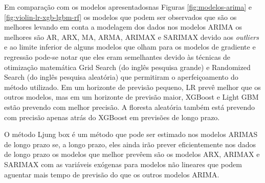 Em comparação com os modelos apresentadosnas Figuras \ref{fig:modelos-arima} e \ref{fig:violin-lr-xgb-lgbm-rf} os modelos que podem ser observados que são os melhores levando em conta a modelagem dos dados nos modelos ARIMA os melhores são AR, ARX, MA, ARMA, ARIMAX e SARIMAX devido aos \textit{outliers} e ao limite inferior de alguns modelos que olham para os modelos de gradiente e regressão pode-se notar que eles eram semelhantes devido às técnicas de otimização matemática Grid Search (do inglês pesquisa grande) e Randomized Search (do inglês pesquisa aleatória) que permitiram o aperfeiçoamento do método utilizado. Em um horizonte de previsão pequeno, LR prevê melhor que os outros modelos, mas em um horizonte de previsão maior, XGBoost e Light GBM estão prevendo com melhor precisão. A floresta aleatória também está prevendo com precisão apenas atrás do XGBoost em previsões de longo prazo.

O método Ljung box é um método que pode ser estimado nos modelos ARIMAS de longo prazo se, a longo prazo, eles ainda irão prever eficientemente nos dados de longo prazo os modelos que melhor prevêem são os modelos ARX, ARIMAX e SARIMAX com as variáveis exógenas para modelos não lineares que podem aguentar mais tempo de previsão do que os outros modelos ARIMA.  

